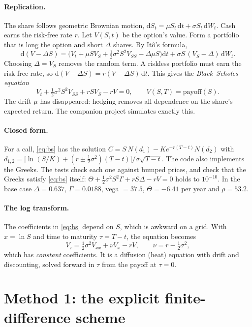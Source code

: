 \documentclass[11pt,a4paper]{article}
\newcommand{\dd}{\mathrm{d}}
\begin{document}
\paragraph{Replication.} The share follows geometric Brownian motion,
$\dd S_t=\mu S_t\,\dd t+\sigma S_t\,\dd W_t$. Cash earns the risk-free rate $r$. Let $V(S,t)$
be the option's value. Form a portfolio that is long the option and short $\Delta$ shares. By
It\^o's formula,
\[
\dd(V-\Delta S)=\Big(V_t+\mu S V_S+\tfrac12\sigma^2S^2V_{SS}-\Delta\mu S\Big)\dd t
+\sigma S\,(V_S-\Delta)\,\dd W_t .
\]
Choosing $\Delta=V_S$ removes the random term. A riskless portfolio must earn the risk-free
rate, so $\dd(V-\Delta S)=r(V-\Delta S)\,\dd t$. This gives the \emph{Black--Scholes equation}
\begin{equation}\label{eq:bs}
V_t+\tfrac12\sigma^2S^2V_{SS}+rSV_S-rV=0,\qquad V(S,T)=\text{payoff}(S).
\end{equation}
The drift $\mu$ has disappeared: hedging removes all dependence on the share's expected return.
The companion project simulates exactly this.

\paragraph{Closed form.} For a call, \eqref{eq:bs} has the solution
$C=S\,N(d_1)-Ke^{-r(T-t)}N(d_2)$ with
$d_{1,2}=\big[\ln(S/K)+(r\pm\frac12\sigma^2)(T-t)\big]/\sigma\sqrt{T-t}$. The code
also implements the Greeks. The tests check each one against bumped prices, and check that the
Greeks satisfy \eqref{eq:bs} itself:
$\Theta+\frac12\sigma^2S^2\Gamma+rS\Delta-rV=0$ holds to $10^{-10}$. In the base case
$\Delta=0.637$, $\Gamma=0.0188$, vega $=37.5$, $\Theta=-6.41$ per year and $\rho=53.2$.

\paragraph{The log transform.} The coefficients in \eqref{eq:bs} depend on $S$, which is awkward
on a grid. With $x=\ln S$ and time to maturity $\tau=T-t$, the equation becomes
\begin{equation}\label{eq:logpde}
V_\tau=\tfrac12\sigma^2V_{xx}+\nu V_x-rV,\qquad \nu=r-\tfrac12\sigma^2,
\end{equation}
which has \emph{constant} coefficients. It is a diffusion (heat) equation with drift and
discounting, solved forward in $\tau$ from the payoff at $\tau=0$.

\section{Method 1: the explicit finite-difference scheme}
\end{document}
